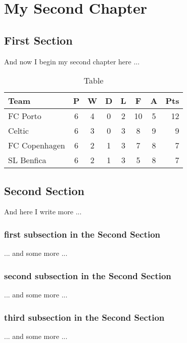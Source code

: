 \chapter{My Second Chapter}

\graphicspath{{Chapters/Chapter2/Chapter2Figs/PNG/}{Chapters/Chapter2/Chapter2Figs/PDF/}{Chapters/Chapter2/Chapter2Figs/}}

\section{First Section}
And now I begin my second chapter here ...

\begin{table}[tbh!]
\caption{Table} 
\label{tab:demo-1}
\centering
\begin{tabular}{l*{6}{c}r}
\hline
Team              & P & W & D & L & F  & A & Pts \\
\hline
FC Porto & 6 & 4 & 0 & 2 & 10 & 5 & 12  \\
Celtic            & 6 & 3 & 0 & 3 &  8 & 9 &  9  \\
FC Copenhagen           & 6 & 2 & 1 & 3 &  7 & 8 &  7  \\
SL Benfica     & 6 & 2 & 1 & 3 &  5 & 8 &  7  \\
\end{tabular}
\end{table}

\section{Second Section}
And here I write more ...

\subsection{first subsection in the Second Section}
... and some more ...

\subsection{second subsection in the Second Section}
... and some more ...

\subsection{third subsection in the Second Section}
... and some more ...
